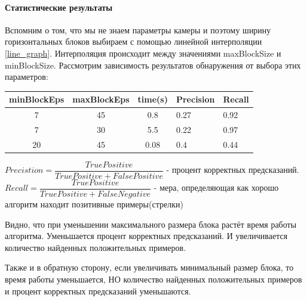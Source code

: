 \newpage
\paragraph{Статистические результаты}
Вспомним о том, что мы не знаем параметры камеры и поэтому ширину горизонтальных блоков выбираем с помощью линейной интерполяции \ref{line_graph}. Интерполяция происходит между значениями maxBlockSize и minBlockSize. 
Рассмотрим зависимость результатов обнаружения от выбора этих параметров:
\begin{table}[!h]
	\begin{tabular}{|c|c|c|l|l|}
		\hline
		\multicolumn{1}{|l|}{\textbf{minBlockEps}} & \multicolumn{1}{l|}{\textbf{maxBlockEps}} & \multicolumn{1}{l|}{\textbf{time(s)}} & \textbf{Precision} & \textbf{Recall} \\ \hline
		7                                          & 45                                        & 0.8                                   & 0.27               & 0.92            \\ \hline
		7                                          & 30                                        & 5.5                                   & 0.22                & 0.97            \\ \hline
		20                                         & 45                                        & 0.08                                  & 0.4               & 0.44             \\ \hline
	\end{tabular}
\end{table}
\newline
$Precistion = \dfrac{TruePositive}{TruePositive + FalsePositive}$ - процент корректных предсказаний.
\newline
$Recall = \dfrac{TruePositive}{TruePositive + FalseNegative}$ - мера, определяющая как хорошо алгоритм находит позитивные примеры(стрелки)

\newpage
Видно, что при уменьшении максимального размера блока растёт время работы алгоритма. Уменьшается процент корректных предсказаний. И увеличивается количество найденных положительных примеров. 

Также и в обратную сторону, если увеличивать минимальный размер блока, то время работы уменьшается, НО количество найденных положительных примеров и процент корректных предсказаний уменьшаются. 

